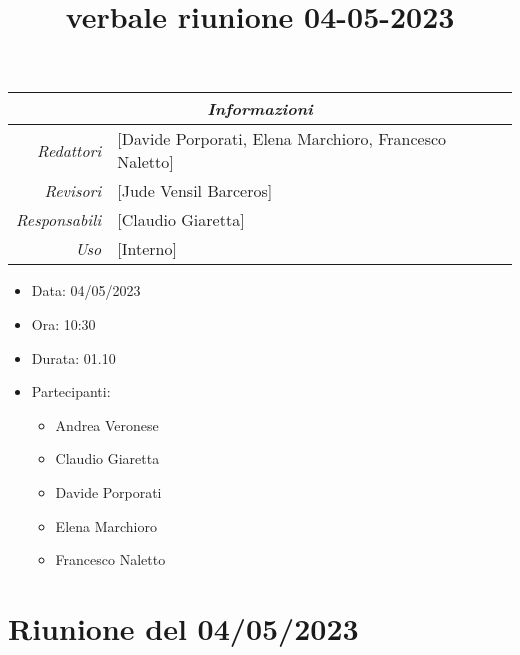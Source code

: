 \documentclass[12pt]{article}
\begin{document}
\graphicspath{ {../../templates/img} }

\title{verbale riunione 04-05-2023}

\firstPage
\maketitle

\begin{center}
\begin{tabular}{r | l}
    \multicolumn{2}{c}{\textit{Informazioni}}\\
    \hline
    
        \textit{Redattori} &
        [Davide Porporati, Elena Marchioro, Francesco Naletto]\makecell{}\\
    
        \textit{Revisori} &
        [Jude Vensil Barceros]\makecell{}\\
        \textit{Responsabili} &
        [Claudio Giaretta]\makecell{}\\
            \textit{Uso} & 
            [Interno]\makecell{}\\
\end{tabular}
    \begin{itemize}
    \item[] Data: 04/05/2023
    \item[] Ora: 10:30
    \item[] Durata: 01.10
    \item[] Partecipanti:
    \begin{itemize}
    \item[] Andrea Veronese
    \item[] Claudio Giaretta
    \item[] Davide Porporati
    \item[] Elena Marchioro
    \item[] Francesco Naletto
    \end{itemize}
    \end{itemize}
\end{center}


\tableofcontents
\printindex 
\section{Riunione del 04/05/2023}
\end{document}
